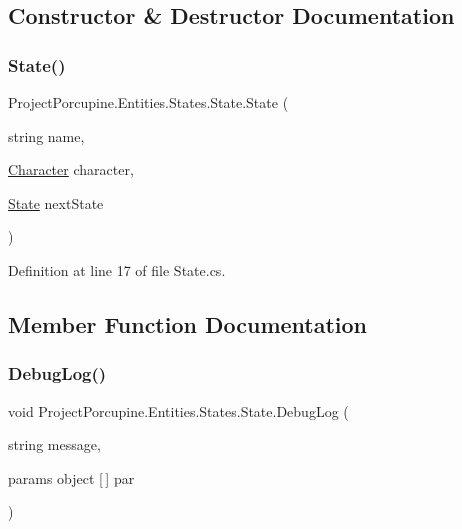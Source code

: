 \subsection{Constructor \& Destructor Documentation}
\mbox{\label{class_project_porcupine_1_1_entities_1_1_states_1_1_state_ad7d3195ae32a038f76b90d9b2af8a204}} 
\subsubsection{\texorpdfstring{State()}{State()}}
{\footnotesize\ttfamily Project\+Porcupine.\+Entities.\+States.\+State.\+State (\begin{DoxyParamCaption}\item[{string}]{name,  }\item[{\hyperlink{class_project_porcupine_1_1_entities_1_1_character}{Character}}]{character,  }\item[{\hyperlink{class_project_porcupine_1_1_entities_1_1_states_1_1_state}{State}}]{next\+State }\end{DoxyParamCaption})}



Definition at line 17 of file State.\+cs.



\subsection{Member Function Documentation}
\mbox{\label{class_project_porcupine_1_1_entities_1_1_states_1_1_state_a47d4b5ed4e9de5c42eefdf39830fd665}} 
\subsubsection{\texorpdfstring{Debug\+Log()}{DebugLog()}}
{\footnotesize\ttfamily void Project\+Porcupine.\+Entities.\+States.\+State.\+Debug\+Log (\begin{DoxyParamCaption}\item[{string}]{message,  }\item[{params object \mbox{[}$\,$\mbox{]}}]{par }\end{DoxyParamCaption})\hspace{0.3cm}{\ttfamily [protected]}}



